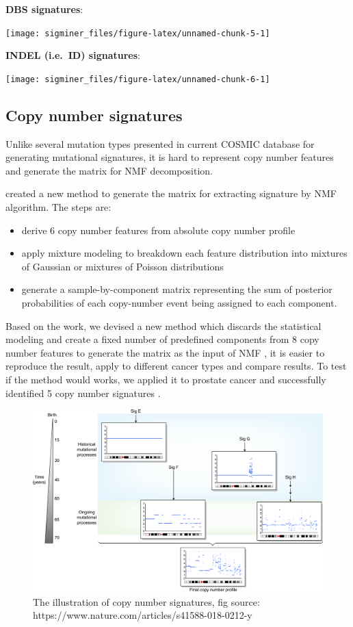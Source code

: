 \documentclass[
  12pt,
  a4paper,
  twoside]{book}
\providecommand{\tightlist}{%
  \setlength{\itemsep}{0pt}\setlength{\parskip}{0pt}}
\begin{document}
\textbf{DBS signatures}:

\texttt{[image: sigminer\_files/figure-latex/unnamed-chunk-5-1]}

\textbf{INDEL (i.e.~ID) signatures}:

\texttt{[image: sigminer\_files/figure-latex/unnamed-chunk-6-1]}

\hypertarget{copy-number-signatures}{%
\subsection{Copy number signatures}\label{copy-number-signatures}}

Unlike several mutation types presented in current COSMIC database for generating mutational signatures, it is hard to represent copy number features and generate the matrix for NMF decomposition.

\citet{macintyre2018copy} created a new method to generate the matrix for extracting signature by NMF algorithm. The steps are:

\begin{itemize}
\tightlist
\item
  derive 6 copy number features from absolute copy number profile
\item
  apply mixture modeling to breakdown each feature distribution into mixtures of Gaussian or mixtures of Poisson distributions
\item
  generate a sample-by-component matrix representing the sum of posterior probabilities of each copy-number event being assigned to each component.
\end{itemize}

Based on the work, we devised a new method which discards the statistical modeling and create a fixed number of predefined components from 8 copy number features to generate the matrix as the input of NMF \citep{wang2021copy},
it is easier to reproduce the result, apply to different cancer types and compare results.
To test if the method would works, we applied it to prostate cancer and successfully identified 5 copy number signatures \citep{wang2021copy}.

\begin{figure}
\includegraphics[width=0.95\linewidth]{fig/cn_signature_overview} \caption{The illustration of copy number signatures, fig source: https://www.nature.com/articles/s41588-018-0212-y}\label{fig:unnamed-chunk-7}
\end{figure}
\end{document}
